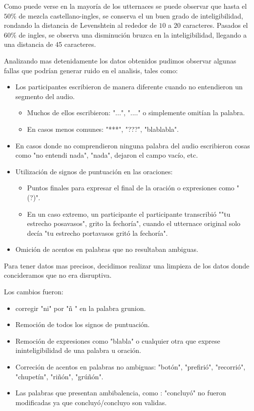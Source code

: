 Como puede verse en la mayoría de los utternaces se puede observar que hasta el $50\%$ de mezcla castellano-ingles, se conserva el un buen grado de inteligibilidad, rondando la distancia de Levenshtein al rededor de $10$ a $20$ caracteres. Pasados el $60\%$ de ingles, se observa una disminución bruzca en la inteligibilidad, llegando a una distancia de 45 caracteres.

Analizando mas detenidamente los datos obtenidos pudimos observar algunas fallas que podrían generar ruido en el analisis, tales como:

\begin{itemize}
	\item Los participantes escribieron de manera diferente cuando no entendieron un segmento del audio.
		\begin{itemize}
		\item Muchos de ellos escribieron: "...", "...." o simplemente omitían la palabra.
		\item En casos menos comunes: "***", "???", "blablabla".
		\end{itemize}
	\item En casos donde no comprendieron ninguna palabra del audio escribieron cosas como "no entendi nada", "nada", dejaron el campo vacío, etc.
	\item Utilización de signos de puntuación en las oraciones:
		\begin{itemize}
		\item Puntos finales para expresar el final de la oración o expresiones como "(?)".
		\item En un caso extremo, un participante el participante transcribió ""tu estrecho posavasos", grito la fechoría", cuando el utternace original solo decía "tu estrecho portavasos gritó la fechoría".
		\end{itemize}
	\item Omición de acentos en palabras que no resultaban ambiguas.
\end{itemize}

Para tener datos mas precisos, decidimos realizar una limpieza de los datos donde concideramos que no era disruptiva.

Los cambios fueron:

\begin{itemize}
\item corregir "ni" por "\~{n} " en la palabra grunion.
\item Remoción de todos los signos de puntuación. 
\item Remoción de expresiones como "blabla" o cualquier otra que exprese ininteligibilidad de una palabra u oración.
\item Correción de acentos en palabras no ambiguas: "botón", "prefirió", "recorrió", "chupetín", "riñón", "grúñón".
\item Las palabras que presentan ambibalencia, como : "concluyó" no fueron modificadas ya que concluyó/concluyo son validas.
\end{itemize}

